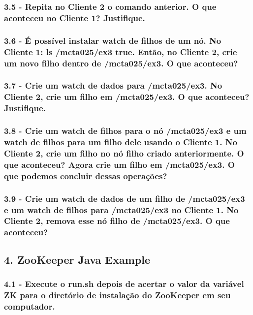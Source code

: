 \subsubsection{3.5 - Repita no Cliente 2 o comando anterior. O que aconteceu no Cliente 1? Justifique.}

\subsubsection{3.6 - É possível instalar watch de filhos de um nó. No Cliente 1: ls
/mcta025/ex3 true. Então, no Cliente 2, crie um novo filho dentro de /mcta025/ex3. O que aconteceu?}

\subsubsection{3.7 - Crie um watch de dados para /mcta025/ex3. No Cliente 2, crie um
filho em /mcta025/ex3. O que aconteceu? Justifique.}

\subsubsection{3.8 - Crie um watch de filhos para o nó /mcta025/ex3 e um watch de filhos para um filho dele usando o Cliente 1. No Cliente 2, crie um filho no
nó filho criado anteriormente. O que aconteceu? Agora crie um filho
em /mcta025/ex3. O que podemos concluir dessas operações?}

\subsubsection{3.9 - Crie um watch de dados de um filho de /mcta025/ex3 e um watch de filhos para /mcta025/ex3 no Cliente 1. No Cliente 2, remova esse nó filho de /mcta025/ex3. O que aconteceu?}

\subsection*{4. ZooKeeper Java Example}

\subsubsection{4.1 - Execute o run.sh depois de acertar o valor da variável ZK para o diretório de instalação do ZooKeeper em seu computador.}

